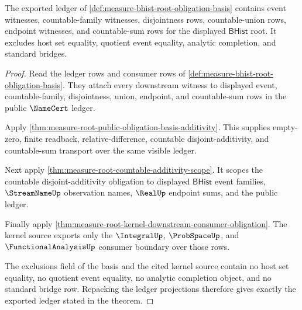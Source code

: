 \begin{theorem}
\label{thm:measure-bhist-root-ledger-obligation}
The exported ledger of \autoref{def:measure-bhist-root-obligation-basis}
contains event witnesses, countable-family witnesses, disjointness rows,
countable-union rows, endpoint witnesses, and countable-sum rows for the
displayed $\mathsf{BHist}$ root. It excludes host set equality, quotient
event equality, analytic completion, and standard bridges.
\end{theorem}
\begin{proof}
Read the ledger rows and consumer rows of
\autoref{def:measure-bhist-root-obligation-basis}. They attach every
downstream witness to displayed event, countable-family, disjointness, union,
endpoint, and countable-sum rows in the public $\NameCert$ ledger.

Apply \autoref{thm:measure-root-public-obligation-basis-additivity}. This
supplies empty-zero, finite readback, relative-difference, countable
disjoint-additivity, and countable-sum transport over the same visible
ledger.

Next apply \autoref{thm:measure-root-countable-additivity-scope}. It scopes
the countable disjoint-additivity obligation to displayed $\mathsf{BHist}$
event families, $\StreamNameUp$ observation names, $\RealUp$ endpoint sums,
and the public ledger.

Finally apply
\autoref{thm:measure-root-kernel-downstream-consumer-obligation}. The
kernel source exports only the $\IntegralUp$, $\ProbSpaceUp$, and
$\FunctionalAnalysisUp$ consumer boundary over those rows.

The exclusions field of the basis and the cited kernel source contain no
host set equality, no quotient event equality, no analytic completion object,
and no standard bridge row. Repacking the ledger projections therefore gives
exactly the exported ledger stated in the theorem.
\end{proof}
